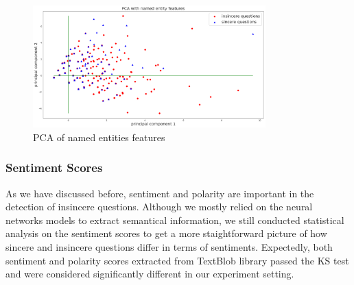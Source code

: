 \documentclass[12pt]{diazessay} %
\begin{document}
\begin{figure}[!htbp]
    \includegraphics[width=0.8\textwidth, center]{graphs/pca/2Dent.png}
    \caption{PCA of named entities features} 
    \label{figure:entpca}
\end{figure}


\subsubsection{Sentiment Scores} %
\label{ssub:sentiment_scores}

As we have discussed before, sentiment and polarity are important in the detection of insincere questions. Although we mostly relied on the neural networks models to extract semantical information, we still conducted statistical analysis on the sentiment scores to get a more staightforward picture of how sincere and insincere questions differ in terms of sentiments. Expectedly, both sentiment and polarity scores extracted from TextBlob library passed the KS test and were considered significantly different in our experiment setting. 
\end{document}
